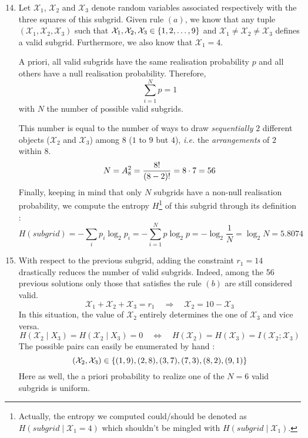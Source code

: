 \documentclass[a4paper, 12pt]{article}
\newcommand{\X}{\mathcal{X}}
\begin{document}
    \begin{enumerate}[leftmargin=*]
        \setcounter{enumi}{13}
        \item Let $\X_1$, $\X_2$ and $\X_3$ denote random variables associated respectively with the three squares of this subgrid. Given rule $(a)$, we know that any tuple $(\X_1, \X_2, \X_3)$ such that $\X_1, \X_2, \X_3 \in \cbk{1, 2, \ldots, 9}$ and $\X_1 \neq \X_2 \neq \X_3$ defines a valid subgrid. Furthermore, we also know that $\X_1 = 4$.
        
        A priori, all valid subgrids have the same realisation probability $p$ and all others have a null realisation probability. Therefore,
        \begin{equation}
            \sum_{i = 1}^N p = 1
        \end{equation}
        with $N$ the number of possible valid subgrids.
        
        This number is equal to the number of ways to draw \emph{sequentially} $2$ different objects ($\X_2$ and $\X_3$) among $8$ ($1$ to $9$ but $4$), \emph{i.e.} the \emph{arrangements} of $2$ within $8$.
        \begin{equation*}
            N = A_8^2 = \frac{8!}{(8 - 2)!} = 8 \cdot 7 = 56
        \end{equation*}
        Finally, keeping in mind that only $N$ subgrids have a non-null realisation probability, we compute the entropy $H$\footnote{Actually, the entropy we computed could/should be denoted as $H(subgrid \mid \X_1 = 4)$ which shouldn't be mingled with $H(subgrid \mid \X_1)$.} of this subgrid through its definition :
        \begin{equation}
            H(subgrid) = -\sum_i p_i \log_2 p_i = -\sum_{i=1}^{N} p \log_2 p = -\log_2 \frac{1}{N} = \log_2 N = \num{5.8074}
        \end{equation}

        \item With respect to the previous subgrid, adding the constraint $r_1 = 14$ drastically reduces the number of valid subgrids. Indeed, among the \num{56} previous solutions only those that satisfies the rule $(b)$ are still considered valid.
        \begin{equation*}
            \X_1 + \X_2 + \X_3 = r_1 \quad \Rightarrow \quad \X_2 = 10 - \X_3
        \end{equation*}
        In this situation, the value of $\X_2$ entirely determines the one of $\X_3$ and vice versa.
        \begin{equation}
            H(\X_2 \mid X_3) = H(\X_2 \mid X_3) = 0 \quad \Leftrightarrow \quad H(\X_2) = H(\X_3) = I(\X_2; \X_3)
        \end{equation}
        The possible pairs can easily be enumerated by hand :
        \begin{equation*}
            (\X_2, \X_3) \in \cbk{(1, 9), (2, 8), (3, 7), (7, 3), (8, 2), (9, 1)}
        \end{equation*}
        Here as well, the a priori probability to realize one of the $N = 6$ valid subgrids is uniform.


\end{enumerate}
\end{document}
